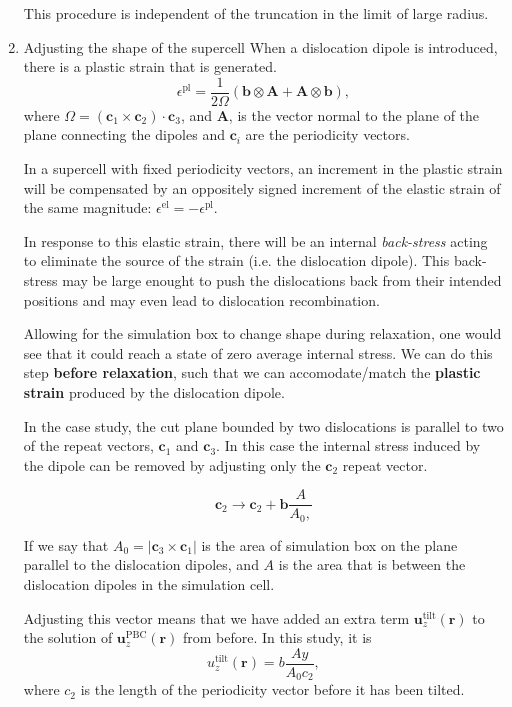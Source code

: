 \documentclass[11pt]{article}
\begin{document}
\begin{enumerate}
This procedure is independent of the truncation in the limit of large
radius.

\item Adjusting the shape of the supercell
\label{sec:orga6e0578}
When a dislocation dipole is introduced, there is a plastic strain that
is generated. 
\[ \epsilon^{\text{pl}} = \frac{1}{2\Omega}( \mathbf{b} \otimes
     \mathbf{A} + \mathbf{A} \otimes \mathbf{b} ), \]
where \(\Omega = (\mathbf{c}_{1} \times \mathbf{c}_{2}) \cdot
     \mathbf{c}_{3}\), and \(\mathbf{A}\), is the vector normal to the plane of
the plane connecting the dipoles and \(\mathbf{c}_{i}\) are the periodicity vectors. 

In a supercell with fixed periodicity vectors, an increment in the
plastic strain will be compensated by an oppositely signed increment of
the elastic strain of the same magnitude: \(\epsilon^{\text{el}} = -
     \epsilon^{\text{pl}}\).

In response to this elastic strain, there will be an internal
\emph{back-stress} acting to eliminate the source of the strain (i.e. the
dislocation dipole). This back-stress may be large enought to push the
dislocations back from their intended positions and may even lead to
dislocation recombination. 

Allowing for the simulation box to change shape during relaxation, one
would see that it could reach a state of zero average internal stress. 
We can do this step \textbf{before relaxation}, such that we can accomodate/match the
\textbf{plastic strain} produced by the dislocation dipole.

In the case study, the cut plane bounded by two dislocations is parallel
to two of the repeat vectors, \(\mathbf{c}_{1}\) and \(\mathbf{c}_{3}\). In
this case the internal stress induced by the dipole can be removed by
adjusting only the \(\mathbf{c}_{2}\) repeat vector. 

\[ \mathbf{c}_{2} \rightarrow \mathbf{c}_{2} + \mathbf{b} \frac{A}{A_{0},} \]

If we say that \(A_{0} = | \mathbf{c}_{3} \times \mathbf{c}_{1} |\) is the area of simulation box on the plane
parallel to the dislocation dipoles, and \(A\) is the area that is between
the dislocation dipoles in the simulation cell. 

Adjusting this vector means that we have added an extra term
\(\mathbf{u}_{z}^{\text{tilt}}(\mathbf{r})\) to the solution of
\(\mathbf{u}_{z}^{\text{PBC}}(\mathbf{r})\) from before. 
In this study, it is 
\[ u_{z}^{\text{tilt}}(\mathbf{r}) = b \frac{Ay}{A_{0}c_{2}}, \]
where \(c_{2}\) is the length of the periodicity vector before it has been
tilted.
\end{enumerate}
\end{document}
